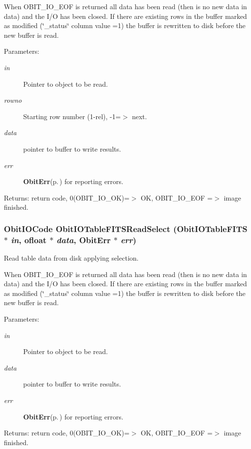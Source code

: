 When OBIT\_\-IO\_\-EOF is returned all data has been read (then is no new data in data) and the I/O has been closed. If there are existing rows in the buffer marked as modified (\char`\"{}\_\-status\char`\"{} column value =1) the buffer is rewritten to disk before the new buffer is read. \begin{Desc}
\item[Parameters:]
\begin{description}
\item[{\em in}]Pointer to object to be read. \item[{\em rowno}]Starting row number (1-rel), -1=$>$ next. \item[{\em data}]pointer to buffer to write results. \item[{\em err}]{\bf Obit\-Err}{\rm (p.\,\pageref{structObitErr})} for reporting errors. \end{description}
\end{Desc}
\begin{Desc}
\item[Returns:]return code, 0(OBIT\_\-IO\_\-OK)=$>$ OK, OBIT\_\-IO\_\-EOF =$>$ image finished. \end{Desc}
\subsubsection{\setlength{\rightskip}{0pt plus 5cm}Obit\-IOCode Obit\-IOTable\-FITSRead\-Select ({\bf Obit\-IOTable\-FITS} $\ast$ {\em in}, {\bf ofloat} $\ast$ {\em data}, {\bf Obit\-Err} $\ast$ {\em err})}\label{ObitIOTableFITS_8c_a24}


Read table data from disk applying selection. 

When OBIT\_\-IO\_\-EOF is returned all data has been read (then is no new data in data) and the I/O has been closed. If there are existing rows in the buffer marked as modified (\char`\"{}\_\-status\char`\"{} column value =1) the buffer is rewritten to disk before the new buffer is read. \begin{Desc}
\item[Parameters:]
\begin{description}
\item[{\em in}]Pointer to object to be read. \item[{\em data}]pointer to buffer to write results. \item[{\em err}]{\bf Obit\-Err}{\rm (p.\,\pageref{structObitErr})} for reporting errors. \end{description}
\end{Desc}
\begin{Desc}
\item[Returns:]return code, 0(OBIT\_\-IO\_\-OK)=$>$ OK, OBIT\_\-IO\_\-EOF =$>$ image finished. \end{Desc}
